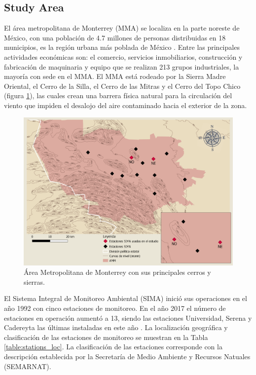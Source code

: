 \subsection{Study Area}
El área metropolitana de Monterrey (MMA) se localiza en la parte noreste de México, con una población de 4.7 millones de personas distribuidas en 18 municipios, es la región urbana más poblada de México \cite{inegi2015}. Entre las principales actividades económicas son: el comercio, servicios inmobiliarios, construcción y fabricación de maquinaria y equipo que se realizan 213 grupos industriales, la mayoría con sede en el MMA. El MMA está rodeado por la Sierra Madre Oriental, el Cerro de la Silla, el Cerro de las Mitras y el Cerro del Topo Chico (figura \ref{fig:map}), las cuales crean una barrera física natural para la circulación del viento que impiden el desalojo del aire contaminado hacia el exterior de la zona.\cite{proaire2008}
\begin{figure}[H]
    \centering
    \includegraphics[scale=0.2]{images/map.png}
    \caption{Área Metropolitana de Monterrey con sus principales cerros y sierras.}
    \label{fig:map}
\end{figure}
El Sistema Integral de Monitoreo Ambiental (SIMA) inició sus operaciones en el año 1992 con cinco estaciones de monitoreo. En el año 2017 el número de estaciones en operación aumentó a 13, siendo las estaciones Universidad, Serena y Cadereyta las últimas instaladas en este año \cite{simapage}. La localización geográfica y clasificación de las estaciones de monitoreo se muestran en la Tabla \ref{table:stations_loc}. La clasificación de las estaciones corresponde con la descripción establecida por la Secretaría de Medio Ambiente y Recursos Natuales (SEMARNAT). \cite{proaire2016}

